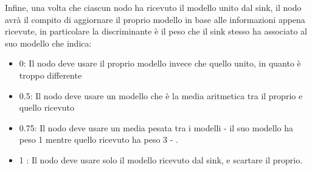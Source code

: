 Infine, una volta che ciascun nodo ha ricevuto il modello unito dal sink, il nodo avrà il compito di aggiornare il proprio modello in base alle informazioni appena ricevute, in particolare la discriminante è il peso che il sink stesso ha associato al suo modello che indica:
\begin{itemize}
  \item 0: Il nodo deve usare il proprio modello invece che quello unito, in quanto è troppo differente
  \item 0.5: Il nodo deve usare un modello che è la media aritmetica tra il proprio e quello ricevuto
  \item 0.75: Il nodo deve usare un media pesata tra i modelli - il suo modello ha peso 1 mentre quello ricevuto ha peso 3 - .
  \item 1 :  Il nodo deve usare solo il modello ricevuto dal sink, e scartare il proprio.
\end{itemize}


